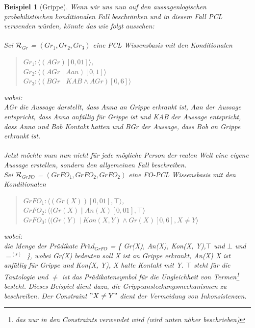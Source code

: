 \documentclass[draft]{scrreprt}
\newtheorem{Bsp}{Beispiel}[section]
\begin{document}
\begin{Bsp}[Grippe]
Wenn wir uns nun auf den aussagenlogischen probabilistischen konditionalen Fall beschränken und in diesem Fall PCL  verwenden würden, könnte das wie folgt aussehen:\\
\\
Sei $ \cal{R} $$_{Gr}  $ = $ (Gr_{1}, Gr_{2}, Gr_{3})  $ eine PCL Wissensbasis mit den Konditionalen 
\begin{quote}
$ Gr_{1}  :  \langle (AGr)[0,01]\rangle $,\\
$ Gr_{2} : \langle (AGr \mid Aan)[0,1]\rangle$\\
$ Gr_{3} : \langle (BGr \mid KAB \wedge AGr )[0,6]\rangle$\\
\end{quote}
wobei:\\
AGr die Aussage darstellt, dass Anna an Grippe erkrankt ist, Aan der Aussage entspricht, dass Anna anfällig für Grippe ist und KAB der Aussage entspricht, dass Anna und Bob Kontakt hatten und BGr der Aussage, dass Bob an Grippe erkrankt ist. 
\\
\\
Jetzt möchte man nun nicht für jede mögliche Person der realen Welt eine eigene Aussage erstellen, sondern den allgemeinen Fall beschreiben.
\\
Sei $ \cal{R} $$_{GrFO} $ = $ (GrFO_{1}, GrFO_{2}, GrFO_{2})  $ eine FO-PCL Wissensbasis mit den Konditionalen 
\begin{quote}
$ GrFO_{1}  :  \langle (Gr(X))[0,01], \top \rangle $,\\
$ GrFO_{2} : \langle (Gr(X) \mid An(X)[0,01], \top \rangle$\\
$ GrFO_{3} : \langle (Gr(Y) \mid Kon(X, Y) \wedge Gr(X )[0,6], X \neq Y \rangle$\\
\end{quote}
wobei:\\
die Menge der Prädikate $Präd_{GrFO}$  = \{ Gr(X), An(X), Kon(X, Y),$ \top $    und $ \bot  $ und $ =^{(s)}$ \}, wobei Gr(X) bedeuten soll X ist an Grippe erkrankt, An(X) X ist anfällig für Grippe und Kon(X, Y),  X hatte Kontakt mit Y. $ \top $ steht für die Tautologie und $ \neq  $ ist das Prädikatensymbol für die Ungleichheit von Termen\footnote{das nur in den Constraints verwendet wird (wird unten näher beschrieben)} besteht. Dieses Beispiel dient dazu, die Grippeansteckungsmechanismen zu beschreiben. Der Constraint $  "{} X \neq Y "{} $ dient der Vermeidung von Inkonsistenzen.


\end{Bsp}
\end{document}
